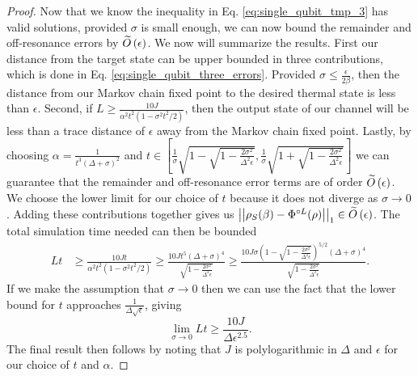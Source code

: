 \begin{proof}
Now that we know the inequality in Eq. \eqref{eq:single_qubit_tmp_3} has valid solutions, provided $\sigma$ is small enough, we can now bound the remainder and off-resonance errors by $\widetilde{O} \left( \epsilon \right)$. 
We now will summarize the results. First our distance from the target state can be upper bounded in three contributions, which is done in Eq. \eqref{eq:single_qubit_three_errors}.
Provided $\sigma \le \frac{\epsilon}{2 \beta}$, then the distance from our Markov chain fixed point to the desired thermal state is less than $\epsilon$. Second, if $L \ge \frac{10 J}{\alpha^2 t^2(1 - \sigma^2 t^2 /2) }$, then the output state of our channel will be less than a trace distance of $\epsilon$ away from the Markov chain fixed point. Lastly, by choosing $\alpha  = \frac{1}{t^3(\Delta + \sigma)^2}$ and $t \in \left[ \frac{1}{\sigma}\sqrt{1 - \sqrt{1 - \frac{2 \sigma^2}{\Delta^2 \epsilon}} }, \frac{1}{\sigma}\sqrt{1 + \sqrt{1 - \frac{2 \sigma^2}{\Delta^2 \epsilon}} } \right]$ we can guarantee that the remainder and off-resonance error terms are of order $\widetilde{O} \left( \epsilon \right)$.  We choose the lower limit for our choice of $t$ because it does not diverge as $\sigma\rightarrow 0$.  Adding these contributions together gives us $\left| \left| \rho_S(\beta) - \Phi^{\circ L }(\rho) \right| \right|_1 \in \widetilde{O} \left( \epsilon \right)$. The total simulation time needed can then be bounded
\begin{align}
    Lt &\ge \frac{10 J t}{\alpha^2 t^2 (1 - \sigma^2 t^2 / 2)} \ge \frac{10 J t^5 (\Delta + \sigma)^4}{\sqrt{1 - \frac{2 \sigma^2}{\Delta^2 \epsilon}}} \ge \frac{10 J \sigma \left( 1 - \sqrt{1 - \frac{2 \sigma^2}{\Delta^2 \epsilon}}\right)^{5/2} (\Delta + \sigma)^4}{\sqrt{1 - \frac{2 \sigma^2}{\Delta^2 \epsilon}}}.
\end{align}
If we make the assumption that $\sigma \to 0$ then we can use the fact that the lower bound for $t$ approaches $\frac{1}{\Delta \sqrt{\epsilon}}$, giving
\begin{equation}
    \lim_{\sigma \to 0} Lt \ge \frac{10 J}{\Delta \epsilon^{2.5}}.
\end{equation}
The final result then follows by noting that $J$ is polylogarithmic in $\Delta$ and $\epsilon$ for our choice of $t$ and $\alpha$.
 \end{proof}


